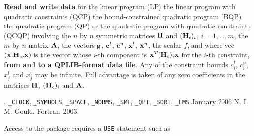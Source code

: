 \documentclass{galahad}
\newcommand{\packagename}{RPD}
\newcommand{\fullpackagename}{\libraryname\_\packagename}
\begin{document}
\galheader


\galsummary
{\bf Read and write data} for the linear program (LP)
the linear program with quadratic constraints (QCP)
the bound-constrained quadratic program (BQP)
the quadratic program (QP)
or the quadratic program with quadratic constraints (QCQP)
involving the $n$ by $n$ symmetric matrices ${\mathbf{H}}$
and $({\mathbf{H}}_c)_i$, $i = 1,\ldots,m$, the $m$ by $n$ matrix ${\mathbf{A}}$,
the vectors ${\mathbf{g}}$, ${\mathbf{c}}^{l}$, ${\mathbf{c}}^{u}$, ${\mathbf{x}}^{l}$,
${\mathbf{x}}^{u}$, the scalar $f$, and
where vec$( {\mathbf{x}} . {\mathbf{H}}_c . {\mathbf{x}} )$ is the vector whose
$i$-th component is  ${\mathbf{x}}^T ({\mathbf{H}}_c)_i {\mathbf{x}}$ for the $i$-th constraint,
{\bf from and to a QPLIB-format data file}.
Any of the constraint bounds $c_{i}^{l}$, $c_{i}^{u}$,
$x_{j}^{l}$ and $x_{j}^{u}$ may be infinite.
Full advantage is taken of any zero coefficients in the matrices ${\mathbf{H}}$,
$({\mathbf{H}}_c)_i$ and ${\mathbf{A}}$.


\galattributes
\galversions{\tt  \fullpackagename\_single, \fullpackagename\_double}.
\galuses
{\tt \libraryname\_CLOCK},
{\tt \libraryname\_SY\-M\-BOLS},
{\tt \libraryname\_SPACE}, {\tt \libraryname\_\-NORMS},
{\tt \libraryname\_\-SMT},
{\tt \libraryname\_\-QPT},
{\tt \libraryname\_SORT},
{\tt \libraryname\_LMS}
\galdate January 2006
\galorigin N. I. M. Gould.
\gallanguage Fortran~2003.


\galhowto

Access to the package requires a {\tt USE} statement such as
\end{document}
